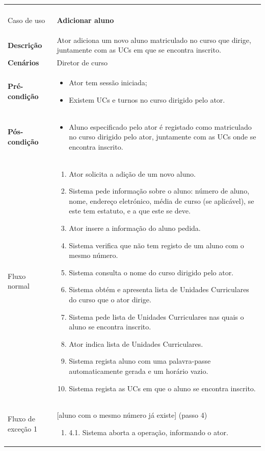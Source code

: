 \documentclass[12pt, a4paper]{article}
\newenvironment{condition}{
    \begin{itemize}[wide=0pt]
        \vspace{-0.2cm}
}{
        \vspace{-0.5cm}
    \end{itemize}
}
\newcommand\flow[1]{
    Fluxo normal &
    \vspace{-0.9cm}
    \singlespacing
    \begin{enumerate}[wide=0pt]
        #1
        \vspace{-0.3cm}
    \end{enumerate} \\ \hline
}
\newcommand\otherflow[3]{
    #1 &
    #2
    \singlespacing
    \begin{enumerate}[wide=0pt]
        #3
        \vspace{-0.3cm}
    \end{enumerate} \\ \hline
}
\newenvironment{usecase}[5]{
    \begin{longtable}{|>{\centering\arraybackslash\bf}m{3cm}|m{13cm}|}
        \multicolumn{2}{c}{\ldots Continua \ldots} \\
        \endfoot
        \endlastfoot

        \hline
        Caso de uso & \textbf{#1} \\

        \hline
        Descrição & #2 \\

        \hline
        Cenários & #3 \\

        \hline
        Pré-condição &
        \vspace{-0.8cm}
        \begin{condition}
            #4
        \end{condition} \\

        \hline
        Pós-condição &
        \vspace{-0.8cm}
        \begin{condition}
            #5
        \end{condition} \\

        \hline
}{
\end{longtable}
}
\begin{document}
\begin{usecase}
    {Adicionar aluno}
    {Ator adiciona um novo aluno matriculado no curso que dirige, juntamente com as UCs em que se
        encontra inscrito.}
    {Diretor de curso}
    {
        \item Ator tem sessão iniciada;
        \item Existem UCs e turnos no curso dirigido pelo ator.
    }
    {
        \item Aluno especificado pelo ator é registado como matriculado no curso dirigido pelo ator,
        juntamente com as UCs onde se encontra inscrito.
    }

    \flow{
        \item Ator solicita a adição de um novo aluno.
        \item Sistema pede informação sobre o aluno: número de aluno, nome, endereço eletrónico,
            média de curso (se aplicável), se este tem estatuto, e a que este se deve.
        \item Ator insere a informação do aluno pedida.
        \item Sistema verifica que não tem registo de um aluno com o mesmo número.
        \item Sistema consulta o nome do curso dirigido pelo ator.
        \item Sistema obtém e apresenta lista de Unidades Curriculares do curso que o ator dirige.
        \item Sistema pede lista de Unidades Curriculares nas quais o aluno se encontra inscrito.
        \item Ator indica lista de Unidades Curriculares.
        \item Sistema regista aluno com uma palavra-passe automaticamente gerada e um horário
            vazio.
        \item Sistema regista as UCs em que o aluno se encontra inscrito.
    }

    \otherflow{Fluxo de exceção 1}
        {[aluno com o mesmo número já existe] (passo 4)}{

        \item[4.1.] Sistema aborta a operação, informando o ator.
    }
\end{usecase}
\end{document}
